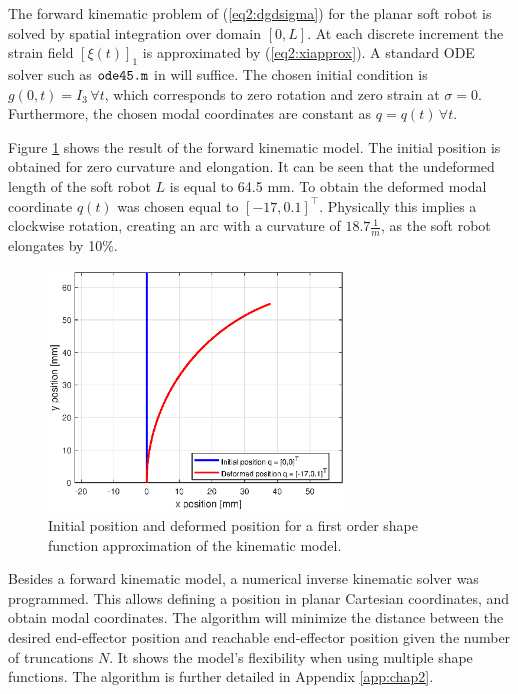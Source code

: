 The forward kinematic problem of (\ref{eq2:dgdsigma}) for the
planar soft robot is solved by spatial integration over domain $[0,L]$. At each discrete increment the strain field $[\xi(t)]_1$ is approximated by (\ref{eq2:xiapprox}). A standard ODE solver such as $\verb+ode45.m+$ in \MATLAB \cite{MATLAB2020} will suffice. The chosen initial condition is $g(0,t) = I_3 \hspace{2pt} \forall t$, which corresponds to zero rotation and zero strain at $\sigma = 0$. Furthermore, the chosen modal coordinates are constant as $q = q(t) \hspace{2pt} \forall t$. 

Figure \ref{fig1:forward_kinematic} shows the result of the forward kinematic model. The initial position is obtained for zero curvature and elongation. It can be seen that the undeformed length of the soft robot $L$ is equal to 64.5 mm. To obtain the deformed modal coordinate $q(t)$ was chosen equal to $[-17,0.1]^\top$. Physically this implies a clockwise rotation, creating an arc with a curvature of $18.7 \frac{1}{m}$, as the soft robot elongates by 10\%.


\begin{figure}[H]
    \centering
    \includegraphics[width = 0.7\textwidth]{Figures/Chapter2/fkin1701.eps}
    \caption{Initial position and deformed position for a first order shape function approximation of the kinematic model.}
    \label{fig1:forward_kinematic}
\end{figure}

Besides a forward kinematic model, a numerical inverse kinematic solver was programmed. This allows defining a position in planar Cartesian coordinates, and obtain modal coordinates. The algorithm will minimize the distance between the desired end-effector position and reachable end-effector position given the number of truncations $N$. It shows the model's flexibility when using multiple shape functions. The algorithm is further detailed in Appendix \ref{app:chap2}. 

